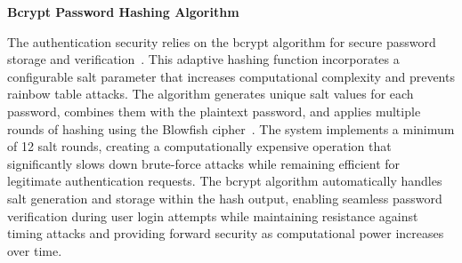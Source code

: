 \textbf{Bcrypt Password Hashing Algorithm}

The authentication security relies on the bcrypt algorithm for secure password
storage and verification~\cite{geeksforgeeks_bcrypt}. This adaptive hashing
function incorporates a configurable salt parameter that increases
computational complexity and prevents rainbow table attacks. The algorithm
generates unique salt values for each password, combines them with the
plaintext password, and applies multiple rounds of hashing using the Blowfish
cipher~\cite{geeksforgeeks_bcrypt}. The system implements a minimum of 12 salt
rounds, creating a computationally expensive operation that significantly slows
down brute-force attacks while remaining efficient for legitimate
authentication requests. The bcrypt algorithm automatically handles salt
generation and storage within the hash output, enabling seamless password
verification during user login attempts while maintaining resistance against
timing attacks and providing forward security as computational power increases
over time.

